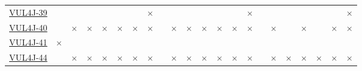 \begin{table}[!htbp]
{\begin{tabular}{|l|lll|ll|ll||lll|ll|ll||lll|ll|ll|}
		\href{https://github.com/cloudfoundry/uaa/commit/a61bfabbad22f646ecf1f00016b448b26a60daf}{VUL4J-39} & \cellcolor{green}\checkmark & \cellcolor{green}\checkmark & \cellcolor{green}\checkmark & \cellcolor{green}\checkmark & \cellcolor{green}\checkmark & \cellcolor{green}\checkmark & \cellcolor{red}$\times$  & \cellcolor{green}\checkmark & \cellcolor{green}\checkmark & \cellcolor{green}\checkmark & \cellcolor{green}\checkmark & \cellcolor{green}\checkmark & \cellcolor{green}\checkmark & \cellcolor{red}$\times$     & \cellcolor{green}\checkmark & \cellcolor{green}\checkmark & \cellcolor{green}\checkmark & \cellcolor{green}\checkmark & \cellcolor{green}\checkmark & \cellcolor{green}\checkmark & \cellcolor{red}$\times$\\ 
		\href{https://github.com/cloudfoundry/uaa/commit/daeedbe499453b06856556f5e9f7e80d2d1ceb03}{VUL4J-40} & \cellcolor{green}\checkmark & \cellcolor{red}$\times$ & \cellcolor{red}$\times$ & \cellcolor{red}$\times$ & \cellcolor{red}$\times$ & \cellcolor{red}$\times$ & \cellcolor{red}$\times$  & \cellcolor{green}\checkmark & \cellcolor{red}$\times$ & \cellcolor{red}$\times$ & \cellcolor{red}$\times$ & \cellcolor{red}$\times$ & \cellcolor{red}$\times$ & \cellcolor{red}$\times$     & \cellcolor{green}\checkmark & \cellcolor{red}$\times$ & \cellcolor{green}\checkmark & \cellcolor{red}$\times$ & \cellcolor{green}\checkmark & \cellcolor{red}$\times$ & \cellcolor{red}$\times$\\ 
		\href{https://github.com/codehaus-plexus/plexus-archiver/commit/58bc24e465c0842981692adbf6d75680298989de}{VUL4J-41} & \cellcolor{red}$\times$ & \cellcolor{green}\checkmark & \cellcolor{green}\checkmark & \cellcolor{green}\checkmark & \cellcolor{green}\checkmark & \cellcolor{green}\checkmark & \cellcolor{green}\checkmark  & \cellcolor{green}\checkmark & \cellcolor{green}\checkmark & \cellcolor{green}\checkmark & \cellcolor{green}\checkmark & \cellcolor{green}\checkmark & \cellcolor{green}\checkmark & \cellcolor{green}\checkmark     & \cellcolor{green}\checkmark & \cellcolor{green}\checkmark & \cellcolor{green}\checkmark & \cellcolor{green}\checkmark & \cellcolor{green}\checkmark & \cellcolor{green}\checkmark & \cellcolor{green}\checkmark\\ 
		\href{https://github.com/ESAPI/esapi-java-legacy/commit/b7cbc53f9cc967cf1a5a9463d8c6fef9ed6ef4f7}{VUL4J-44} & \cellcolor{green}\checkmark & \cellcolor{red}$\times$ & \cellcolor{red}$\times$ & \cellcolor{red}$\times$ & \cellcolor{red}$\times$ & \cellcolor{red}$\times$ & \cellcolor{red}$\times$  & \cellcolor{green}\checkmark & \cellcolor{red}$\times$ & \cellcolor{red}$\times$ & \cellcolor{red}$\times$ & \cellcolor{red}$\times$ & \cellcolor{red}$\times$ & \cellcolor{red}$\times$     & \cellcolor{green}\checkmark & \cellcolor{red}$\times$ & \cellcolor{red}$\times$ & \cellcolor{red}$\times$ & \cellcolor{red}$\times$ & \cellcolor{red}$\times$ & \cellcolor{red}$\times$\\ 

\end{tabular}}
\end{table}
